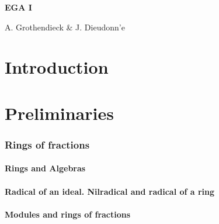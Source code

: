 \documentclass{book}
\begin{document}
\begin{titlepage}
\pagestyle{empty}
\setcounter{page}{1}
\centerline{\LARGE\bfseries EGA I}
\centerline{A. Grothendieck \& J. Dieudonn{'e}}
\end{titlepage}



\part*{Introduction}





\clearpage



\setcounter{part}{-1}



\part{Preliminaries}

\label{0-prelim}



    \section{Rings of fractions}

    \label{0-prelim-1}

    \setcounter{subsection}{-1}



        \subsection{Rings and Algebras}

        \label{0-prelim-1.0}

        



        \subsection{Radical of an ideal. Nilradical and radical of a ring}

        \label{0-prelim-1.1}

        



        \subsection{Modules and rings of fractions}
\end{document}
